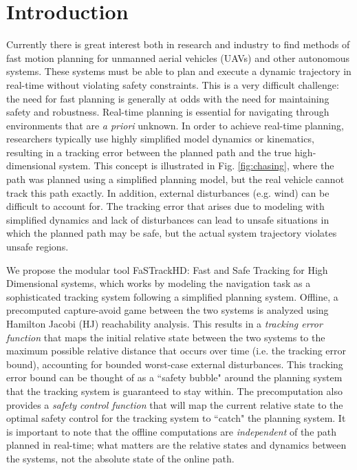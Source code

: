 \section{Introduction}
 Currently there is great interest both in research and industry to find methods of fast motion planning for unmanned aerial vehicles (UAVs) and other autonomous systems. These systems must be able to plan and execute a dynamic trajectory in real-time without violating safety constraints. This is a very difficult challenge: the need for fast planning is generally at odds with the need for maintaining safety and robustness. Real-time planning is essential for navigating through environments that are \textit{a priori} unknown. In order to achieve real-time planning, researchers typically use highly simplified model dynamics or kinematics, resulting in a tracking error between the planned path and the true high-dimensional system. This concept is illustrated in Fig. \ref{fig:chasing}, where the path was planned using a simplified planning model, but the real vehicle cannot track this path exactly. In addition, external disturbances (e.g. wind) can be difficult to account for. The tracking error that arises due to modeling with simplified dynamics and lack of disturbances can lead to unsafe situations in which the planned path may be safe, but the actual system trajectory violates unsafe regions.

We propose the modular tool FaSTrackHD: Fast and Safe Tracking for High Dimensional systems, which works by modeling the navigation task as a sophisticated tracking system following a simplified planning system. Offline, a precomputed capture-avoid game between the two systems is analyzed using Hamilton Jacobi (HJ) reachability analysis. This results in a \textit{tracking error function} that maps the initial relative state between the two systems to the maximum possible relative distance that occurs over time (i.e. the tracking error bound), accounting for bounded worst-case external disturbances. This tracking error bound can be thought of as a ``safety bubble" around the planning system that the tracking system is guaranteed to stay within. The precomputation also provides a \textit{safety control function} that will map the current relative state to the optimal safety control for the tracking system to ``catch" the planning system. It is important to note that the offline computations are \textit{independent} of the path planned in real-time; what matters are the relative states and dynamics between the systems, not the absolute state of the online path.

